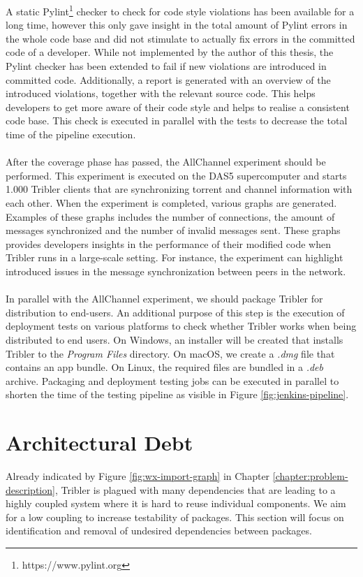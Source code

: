 A static Pylint\footnote{https://www.pylint.org} checker to check for code style violations has been available for a long time, however this only gave insight in the total amount of Pylint errors in the whole code base and did not stimulate to actually fix errors in the committed code of a developer. While not implemented by the author of this thesis, the Pylint checker has been extended to fail if new violations are introduced in committed code. Additionally, a report is generated with an overview of the introduced violations, together with the relevant source code. This helps developers to get more aware of their code style and helps to realise a consistent code base. This check is executed in parallel with the tests to decrease the total time of the pipeline execution.\\\\
After the coverage phase has passed, the AllChannel experiment should be performed. This experiment is executed on the DAS5 supercomputer and starts 1.000 Tribler clients that are synchronizing torrent and channel information with each other. When the experiment is completed, various graphs are generated. Examples of these graphs includes the number of connections, the amount of messages synchronized and the number of invalid messages sent. These graphs provides developers insights in the performance of their modified code when Tribler runs in a large-scale setting. For instance, the experiment can highlight introduced issues in the message synchronization between peers in the network.\\\\
In parallel with the AllChannel experiment, we should package Tribler for distribution to end-users. An additional purpose of this step is the execution of deployment tests on various platforms to check whether Tribler works when being distributed to end users. On Windows, an installer will be created that installs Tribler to the \emph{Program Files} directory. On macOS, we create a \emph{.dmg} file that contains an app bundle. On Linux, the required files are bundled in a \emph{.deb} archive. Packaging and deployment testing jobs can be executed in parallel to shorten the time of the testing pipeline as visible in Figure \ref{fig:jenkins-pipeline}.

\section{Architectural Debt}
Already indicated by Figure \ref{fig:wx-import-graph} in Chapter \ref{chapter:problem-description}, Tribler is plagued with many dependencies that are leading to a highly coupled system where it is hard to reuse individual components. We aim for a low coupling to increase testability of packages. This section will focus on identification and removal of undesired dependencies between packages.

